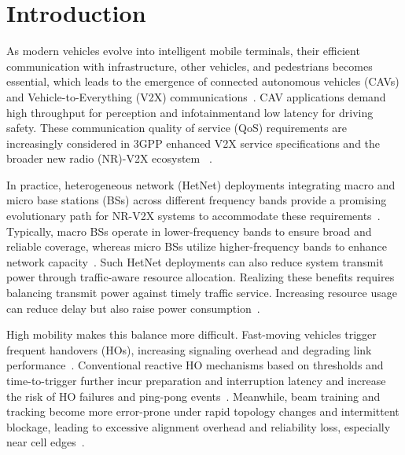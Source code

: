 \documentclass[10pt,journal,letterpaper]{IEEEtran}
\newcommand{\rev}[1]{\textcolor{revisioncolor}{{}#1}}
\newcommand{\omitted}[1]{}
\theoremstyle{remark}
\begin{document}
\section{Introduction}

As modern vehicles evolve into intelligent mobile terminals, their efficient communication with infrastructure, other vehicles, and pedestrians becomes essential, which leads to the emergence of connected autonomous vehicles (CAVs) and Vehicle-to-Everything (V2X) communications~\cite{c-v2x}. CAV applications demand \omitted{} high throughput for perception and infotainment\omitted{}\rev{\space and low latency for driving safety}\omitted{}. \omitted{}\rev{These} communication quality of service (QoS) requirements are increasingly considered in 3GPP enhanced V2X service specifications and the broader new radio (NR)-V2X ecosystem
~\cite{3GPP-TS-22.186,bagheri2020nrv2x}. 

In practice, heterogeneous network (HetNet) deployments integrating macro and micro base stations (BSs) across different frequency bands provide a promising evolutionary path for NR-V2X systems to accommodate these requirements~\cite{3GPP-TR-38.913}. Typically, macro BSs operate in lower-frequency bands to ensure broad and reliable coverage, whereas micro BSs utilize higher-frequency bands to enhance network capacity~\cite{xu2021survey}. 
\omitted{}\rev{Such HetNet deployments can also reduce system transmit power through traffic-aware resource allocation.}
\rev{Realizing these benefits requires balancing transmit power against timely traffic service. Increasing resource usage can reduce delay but also raise power consumption~\cite{niu2015}.}\par
\omitted{}\rev{High mobility makes this balance more difficult.} Fast-moving vehicles trigger frequent handovers (HOs), increasing signaling overhead and degrading link performance~\cite{hasan2018frequent,nan2023}. 
Conventional reactive HO mechanisms based on thresholds and time-to-trigger further incur preparation and interruption latency and increase the risk of HO failures and ping-pong events~\cite{lee2020prediction}. 
Meanwhile, beam training and tracking become more error-prone under rapid topology changes and intermittent blockage, leading to excessive alignment overhead and reliability loss, especially near cell edges~\cite{elayach2014twc,alrabeiah2020tcom}. 
\omitted{}
\end{document}
